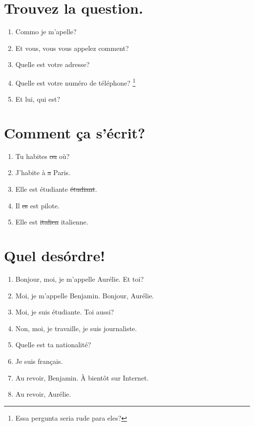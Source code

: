 \section{Trouvez la question.}

\begin{enumerate}
    \item Commo je m'apelle?
    \item Et vous, vous vous appelez comment?
    \item Quelle est votre adresse?
    \item Quelle est votre numéro de téléphone? \footnote{Essa pergunta seria rude para eles?}
    \item Et lui, qui est?
\end{enumerate}

\section{Comment ça s'écrit?}

\begin{enumerate}
    \item Tu habites \sout{ou} où?
    \item J'habite à \sout{a} Paris.
    \item Elle est étudiante \sout{étudiant}.
    \item Il \sout{es} est pilote.
    \item Elle est \sout{italien} italienne.
\end{enumerate}

\section{Quel desórdre!}

\begin{enumerate}
    \item Bonjour, moi, je m'appelle Aurélie. Et toi?
    \item Moi, je m'appelle Benjamin. Bonjour, Aurélie.
    \item Moi, je suis étudiante. Toi aussi?
    \item Non, moi, je travaille, je suis journaliste.
    \item Quelle est ta nationalité?
    \item Je suis français.
    \item Au revoir, Benjamin. À bientôt sur Internet.
    \item Au revoir, Aurélie.
\end{enumerate}